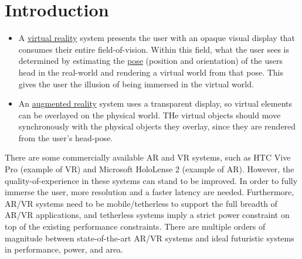 \section{Introduction}

\begin{itemize}
\item A \ul{virtual reality} system presents the user with an opaque visual display that consumes their entire {field-of-vision}. Within this field, what the user sees is determined by estimating the \ul{pose} (position and orientation) of the users head in the real-world and {rendering} a virtual world from that pose. This gives the user the illusion of being immersed in the virtual world.

\item An \ul{augmented reality} system uses a transparent display, so virtual elements can be overlayed on the physical world. THe virtual objects should move synchronously with the physical objects they overlay, since they are rendered from the user's head-pose.



\end{itemize}

There are some commercially available AR and VR systems, such as HTC Vive Pro (example of VR) and Microsoft HoloLense 2 (example of AR). However, the {quality-of-experience} in these systems can stand to be improved. In order to fully immerse the user, more resolution and a faster latency are needed. Furthermore, AR/VR systems need to be mobile/tetherless to support the full breadth of AR/VR applications, and tetherless systems imply a strict power constraint on top of the existing performance constraints. There are multiple orders of magnitude between state-of-the-art AR/VR systems and ideal futuristic systems in performance, power, and area. 


